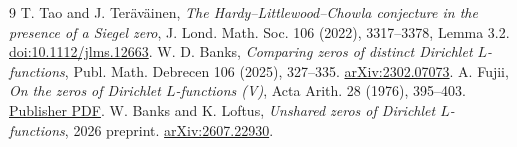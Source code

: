 \documentclass[11pt]{article}
\begin{document}
\begin{thebibliography}{9}
 T. Tao and J. Ter\"av\"ainen, \emph{The Hardy--Littlewood--Chowla
conjecture in the presence of a Siegel zero}, J. Lond. Math. Soc. 106 (2022),
3317--3378, Lemma 3.2. \href{https://doi.org/10.1112/jlms.12663}{doi:10.1112/jlms.12663}.
 W. D. Banks, \emph{Comparing zeros of distinct Dirichlet
$L$-functions}, Publ. Math. Debrecen 106 (2025), 327--335.
\href{https://arxiv.org/abs/2302.07073}{arXiv:2302.07073}.
 A. Fujii, \emph{On the zeros of Dirichlet $L$-functions (V)},
Acta Arith. 28 (1976), 395--403.
\href{https://matwbn.icm.edu.pl/ksiazki/aa/aa28/aa2847.pdf}{Publisher PDF}.
 W. Banks and K. Loftus, \emph{Unshared zeros of Dirichlet $L$-functions},
2026 preprint. \href{https://arxiv.org/abs/2607.22930}{arXiv:2607.22930}.
\end{thebibliography}
\end{document}
